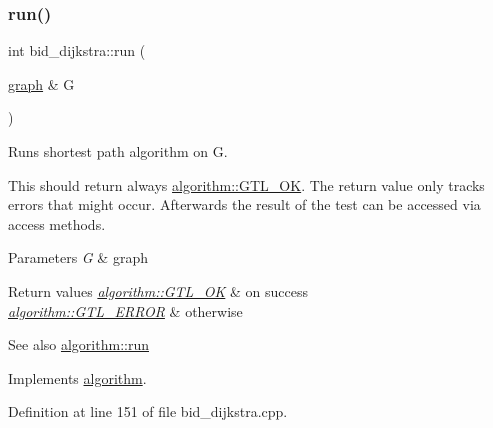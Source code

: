 \subsubsection{\texorpdfstring{run()}{run()}}
{\footnotesize\ttfamily int bid\+\_\+dijkstra\+::run (\begin{DoxyParamCaption}\item[{\mbox{\hyperlink{classgraph}{graph}} \&}]{G }\end{DoxyParamCaption})\hspace{0.3cm}{\ttfamily [virtual]}}



Runs shortest path algorithm on {\ttfamily G}. 

This should return always \mbox{\hyperlink{classalgorithm_af1a0078e153aa99c24f9bdf0d97f6710a5114c20e4a96a76b5de9f28bf15e282b}{algorithm\+::\+G\+T\+L\+\_\+\+OK}}. The return value only tracks errors that might occur. Afterwards the result of the test can be accessed via access methods.


\begin{DoxyParams}{Parameters}
{\em G} & graph\\
\hline
\end{DoxyParams}

\begin{DoxyRetVals}{Return values}
{\em \mbox{\hyperlink{classalgorithm_af1a0078e153aa99c24f9bdf0d97f6710a5114c20e4a96a76b5de9f28bf15e282b}{algorithm\+::\+G\+T\+L\+\_\+\+OK}}} & on success \\
\hline
{\em \mbox{\hyperlink{classalgorithm_af1a0078e153aa99c24f9bdf0d97f6710a6fcf574690bbd6cf710837a169510dd7}{algorithm\+::\+G\+T\+L\+\_\+\+E\+R\+R\+OR}}} & otherwise\\
\hline
\end{DoxyRetVals}
\begin{DoxySeeAlso}{See also}
\mbox{\hyperlink{classalgorithm_a734b189509a8d6b56b65f8ff772d43ca}{algorithm\+::run}} 
\end{DoxySeeAlso}


Implements \mbox{\hyperlink{classalgorithm_a734b189509a8d6b56b65f8ff772d43ca}{algorithm}}.



Definition at line 151 of file bid\+\_\+dijkstra.\+cpp.


